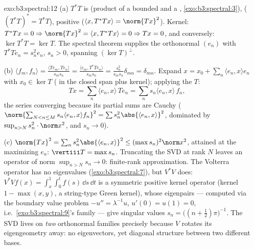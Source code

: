 \begin{solution}{exo:b3:spectral:12}
(a) $T^*T$ is  (product of a bounded and a , \cref{exo:b3:spectral:3}), 
($(T^*T)^* = T^*T$), positive ($\langle x, T^*Tx\rangle =
\norm{Tx}^2$). Kernel: $T^*Tx = 0 \Rightarrow \norm{Tx}^2 =
\langle x, T^*Tx\rangle = 0 \Rightarrow Tx = 0$, and
conversely: $\ker T^*T = \ker T$. The spectral theorem
supplies the orthonormal $(e_n)$ with $T^*Te_n = s_n^2e_n$,
$s_n > 0$, spanning $(\ker T)^\perp$.

(b) $\langle f_m, f_n\rangle = \frac{\langle Te_m,
Te_n\rangle}{s_ms_n} = \frac{\langle e_m,
T^*Te_n\rangle}{s_ms_n} = \frac{s_n^2}{s_ms_n}\delta_{mn} =
\delta_{mn}$. Expand $x = x_0 + \sum_n\langle e_n, x\rangle
e_n$ with $x_0 \in \ker T$ ( in the closed span plus
kernel); applying the  $T$:
\[
Tx = \sum_n\langle e_n, x\rangle\,Te_n =
\sum_ns_n\langle e_n, x\rangle\,f_n,
\]
the series converging because its partial sums are Cauchy
($\norm{\sum_{N<n\leq M}s_n\langle e_n, x\rangle f_n}^2 =
\sum s_n^2\abs{\langle e_n, x\rangle}^2$, dominated by
$\sup_{n>N}s_n^2\cdot\norm x^2$, and $s_n \to 0$).

(c) $\norm{Tx}^2 = \sum_ns_n^2\abs{\langle e_n, x\rangle}^2
\leq (\max s_n)^2\norm x^2$, attained at the maximizing
$e_n$: $\vertiii T = \max s_n$. Truncating the SVD at rank
$N$ leaves an operator of norm $\sup_{n>N}s_n \to 0$:
finite-rank approximation. The Volterra operator has no
eigenvalues (\cref{exo:b3:spectral:7}), but $V^*V$ does:
$V^*Vf(x) = \int_x^1\int_0^tf(s)\,\dd s\,\dd t$ is a
symmetric positive kernel operator (kernel $1 - \max(x,y)$,
a string-type Green kernel), whose eigenpairs --- computed
via the boundary value problem $-u'' = \lambda^{-1}u$, $u'(0)
= u(1) = 0$, i.e.\ \cref{exo:b3:spectral:9}'s family --- give
singular values $s_n = \bigl((n + \frac12)\pi\bigr)^{-1}$.
The SVD lives on \emph{two} orthonormal families precisely
because $V$ rotates its eigengeometry away: no eigenvectors,
yet  diagonal structure between two different bases.
\end{solution}

